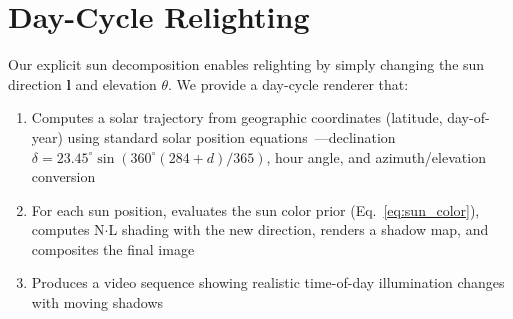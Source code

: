 \documentclass[conference]{IEEEtran}
\begin{document}

\section{Day-Cycle Relighting}
\label{sec:relighting}

Our explicit sun decomposition enables relighting by simply changing the sun direction $\mathbf{l}$ and elevation $\theta$.
We provide a day-cycle renderer that:
\begin{enumerate}
    \item Computes a solar trajectory from geographic coordinates (latitude, day-of-year) using standard solar position equations~\cite{meeus1991astronomical}---declination $\delta = 23.45^\circ \sin(360^\circ(284+d)/365)$, hour angle, and azimuth/elevation conversion
    \item For each sun position, evaluates the sun color prior (Eq.~\ref{eq:sun_color}), computes N$\cdot$L shading with the new direction, renders a shadow map, and composites the final image
    \item Produces a video sequence showing realistic time-of-day illumination changes with moving shadows
\end{enumerate}
\end{document}

